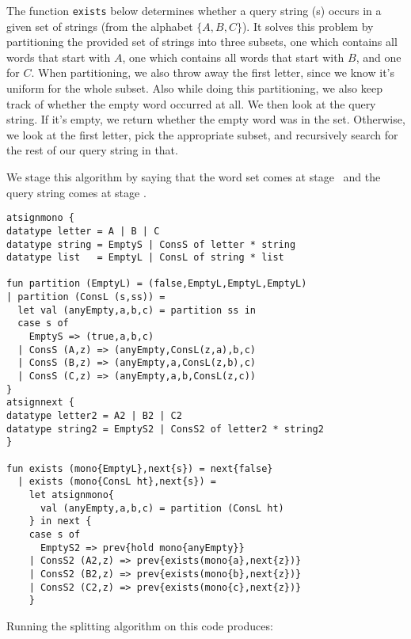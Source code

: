 The function {\tt exists} below determines whether a query string (s) occurs in a given set of strings (from the alphabet $\{A, B,C\}$).
It solves this problem by partitioning the provided set of strings into three subsets,
one which contains all words that start with $A$,
one which contains all words that start with $B$, and one for $C$.
When partitioning, we also throw away the first letter, since we know it's uniform for the whole subset.
Also while doing this partitioning, we also keep track of whether the empty word occurred at all.
We then look at the query string.  If it's empty, we return whether the empty word was in the set.
Otherwise, we look at the first letter, pick the appropriate subset, 
and recursively search for the rest of our query string in that.

We stage this algorithm by saying that the word set comes at stage \bbone\
and the query string comes at stage \bbtwo.

\begin{lstlisting} 
atsignmono { 
datatype letter = A | B | C 
datatype string = EmptyS | ConsS of letter * string
datatype list   = EmptyL | ConsL of string * list

fun partition (EmptyL) = (false,EmptyL,EmptyL,EmptyL) 
| partition (ConsL (s,ss)) = 
  let val (anyEmpty,a,b,c) = partition ss in 
  case s of 
    EmptyS => (true,a,b,c) 
  | ConsS (A,z) => (anyEmpty,ConsL(z,a),b,c) 
  | ConsS (B,z) => (anyEmpty,a,ConsL(z,b),c) 
  | ConsS (C,z) => (anyEmpty,a,b,ConsL(z,c)) 
}
atsignnext { 
datatype letter2 = A2 | B2 | C2
datatype string2 = EmptyS2 | ConsS2 of letter2 * string2
}

fun exists (mono{EmptyL},next{s}) = next{false} 
  | exists (mono{ConsL ht},next{s}) = 
	let atsignmono{
	  val (anyEmpty,a,b,c) = partition (ConsL ht)
	} in next { 
	case s of 
	  EmptyS2 => prev{hold mono{anyEmpty}} 
	| ConsS2 (A2,z) => prev{exists(mono{a},next{z})} 
	| ConsS2 (B2,z) => prev{exists(mono{b},next{z})}
	| ConsS2 (C2,z) => prev{exists(mono{c},next{z})}  
	} 
\end{lstlisting}

\noindent
Running the splitting algorithm on this code produces:

